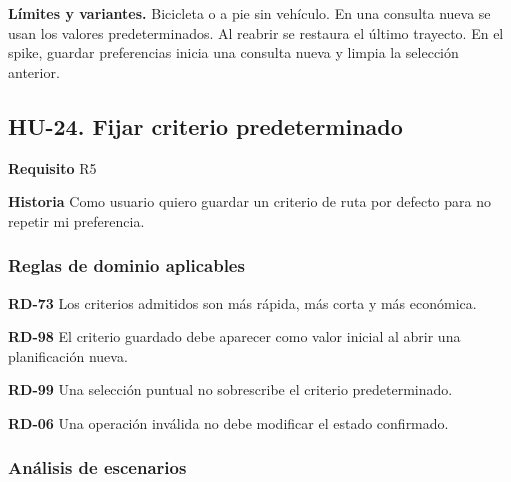 {\fontsize{9}{11.8}\selectfont\textbf{Límites y variantes.} Bicicleta o a pie sin vehículo. En una consulta nueva se usan los valores predeterminados. Al reabrir se restaura el último trayecto. En el spike, guardar preferencias inicia una consulta nueva y limpia la selección anterior.\par}\vspace{4pt}
\clearpage\subsection*{HU-24. Fijar criterio predeterminado}

\textbf{Requisito} R5\par

\textbf{Historia} Como usuario quiero guardar un criterio de ruta por defecto para no repetir mi preferencia.\par

\subsubsection*{Reglas de dominio aplicables}

\textbf{RD-73} Los criterios admitidos son más rápida, más corta y más económica.\par

\textbf{RD-98} El criterio guardado debe aparecer como valor inicial al abrir una planificación nueva.\par

\textbf{RD-99} Una selección puntual no sobrescribe el criterio predeterminado.\par

\textbf{RD-06} Una operación inválida no debe modificar el estado confirmado.\par

\subsubsection*{Análisis de escenarios}

